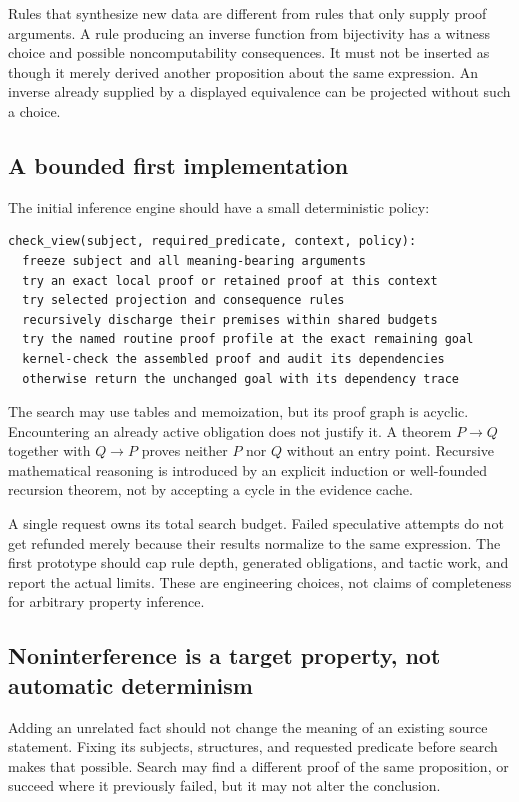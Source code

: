 \documentclass[11pt,letterpaper]{article}
\theoremstyle{remark}
\begin{document}
Rules that synthesize new data are different from rules that only supply proof
arguments. A rule producing an inverse function from bijectivity has a witness
choice and possible noncomputability consequences. It must not be inserted as
though it merely derived another proposition about the same expression.
An inverse already supplied by a displayed equivalence can be projected without
such a choice.

\subsection{A bounded first implementation}
The initial inference engine should have a small deterministic policy:
\begin{lstlisting}[caption={Proposed demand-driven refinement algorithm.}]
check_view(subject, required_predicate, context, policy):
  freeze subject and all meaning-bearing arguments
  try an exact local proof or retained proof at this context
  try selected projection and consequence rules
  recursively discharge their premises within shared budgets
  try the named routine proof profile at the exact remaining goal
  kernel-check the assembled proof and audit its dependencies
  otherwise return the unchanged goal with its dependency trace
\end{lstlisting}

The search may use tables and memoization, but its proof graph is acyclic.
Encountering an already active obligation does not justify it. A theorem
$P\to Q$ together with $Q\to P$ proves neither $P$ nor $Q$ without an entry
point. Recursive mathematical reasoning is introduced by an explicit induction
or well-founded recursion theorem, not by accepting a cycle in the evidence
cache.

A single request owns its total search budget. Failed speculative attempts do
not get refunded merely because their results normalize to the same expression.
The first prototype should cap rule depth, generated obligations, and tactic
work, and report the actual limits. These are engineering choices, not claims
of completeness for arbitrary property inference.

\subsection{Noninterference is a target property, not automatic determinism}
Adding an unrelated fact should not change the meaning of an existing source
statement. Fixing its subjects, structures, and requested predicate before
search makes that possible. Search may find a different proof of the same
proposition, or succeed where it previously failed, but it may not alter the
conclusion.
\end{document}
